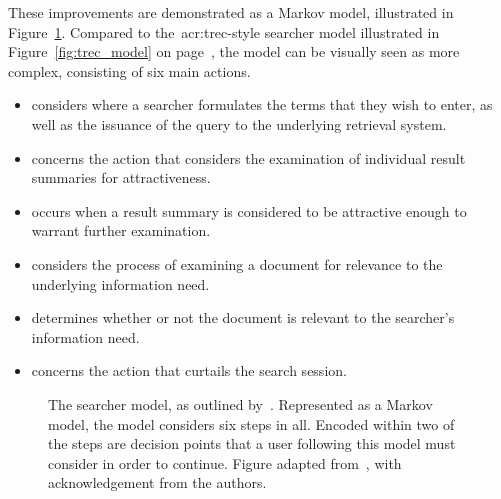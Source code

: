 These improvements are demonstrated as a Markov model, illustrated in Figure~\ref{fig:baskaya_model}. Compared to the~\gls{acr:trec}-style searcher model illustrated in Figure~\ref{fig:trec_model} on page~\pageref{fig:trec_model}, the model can be visually seen as more complex, consisting of six main actions.

\begin{itemize}
    \item{ considers where a searcher formulates the terms that they wish to enter, as well as the issuance of the query to the underlying retrieval system.}
    \item{ concerns the action that considers the examination of individual result summaries for attractiveness.}
    \item{ occurs when a result summary is considered to be attractive enough to warrant further examination.}
    \item{ considers the process of examining a document for relevance to the underlying information need.}
    \item{ determines whether or not the document is relevant to the searcher's information need.}
    \item{ concerns the action that curtails the search session.}
\end{itemize}

\begin{figure}[t!]
    \centering
    \caption[Markov model of the search process by~\cite{baskaya2013behavioural_factors}]{The searcher model, as outlined by~\cite{baskaya2013behavioural_factors}. Represented as a Markov model, the model considers six steps in all. Encoded within two of the steps are decision points that a user following this model must consider in order to continue. Figure adapted from~\cite{baskaya2013behavioural_factors}, with acknowledgement from the authors.}
    \label{fig:baskaya_model}
\end{figure}


